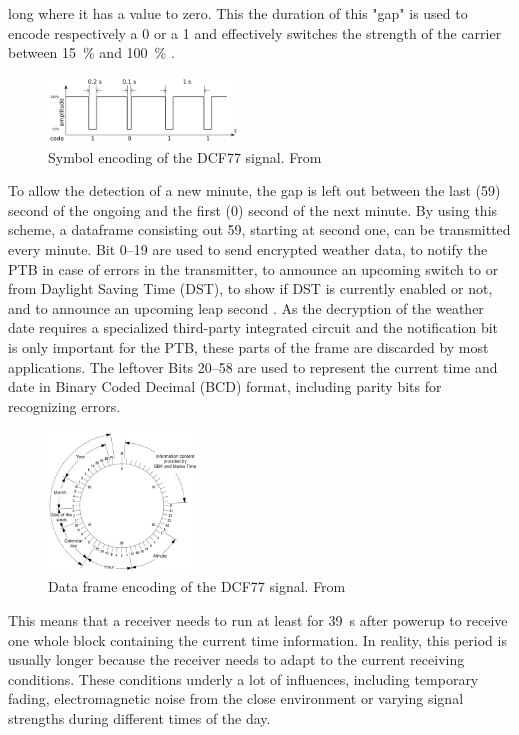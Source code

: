 \documentclass[conference]{IEEEtran}
\begin{document}
long where it has a value to zero.
This the duration of this "gap" is used to encode respectively a 0 or a 1 and effectively switches the strength of the carrier between \SI{15}{\percent} and \SI{100}{\percent} \cite{b5}.
\begin{figure}[htbp]
    \centerline{\includegraphics[width=0.45\textwidth]{img/dcf77_symbol_encoding.png}}
    \caption{Symbol encoding of the DCF77 signal. From \cite{b1}}
    \label{fig:dcf77_symbol_encoding}
\end{figure}
\FloatBarrier\noindent
To allow the detection of a new minute, the gap is left out between the last (59) second of the ongoing and the first (0) second of the next minute.
By using this scheme, a dataframe consisting out \SI{59}{\Bit}, starting at second one, can be transmitted every minute.
Bit \SIrange{0}{19}{} are used to send encrypted weather data, to notify the PTB in case of errors in the transmitter, to announce an upcoming
switch to or from Daylight Saving Time (DST), to show if DST is currently enabled or not, and to announce an upcoming leap second \cite{b5}.
As the decryption of the weather date requires a specialized third-party integrated circuit and the notification bit is only important for the PTB, these parts
of the frame are discarded by most applications.
The leftover Bits \SIrange{20}{58}{} are used to represent the current time and date in Binary Coded Decimal (BCD) format, including parity bits for recognizing errors.
\begin{figure}[htbp]
    \centerline{\includegraphics[width=0.35\textwidth]{img/dcf77_frame_encoding.jpg}}
    \caption{Data frame encoding of the DCF77 signal. From \cite{b5}}
    \label{fig:dcf77_data_encoding}
\end{figure}
\FloatBarrier\noindent
This means that a receiver needs to run at least for \SI{39}{\second} after powerup to receive one whole block containing the current time information.
In reality, this period is usually longer because the receiver needs to adapt to the current receiving conditions. 
These conditions underly a lot of influences, including temporary fading, electromagnetic noise from the close environment or varying signal strengths
during different times of the day.
\end{document}
